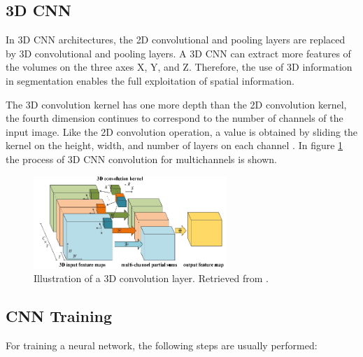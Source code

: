 \subsection*{3D CNN}
\label{subsection:3dcnn}
In \ac{3D} \ac{CNN} architectures, the \ac{2D} convolutional and pooling layers are replaced by \ac{3D} convolutional and pooling layers. A \ac{3D} \ac{CNN} can extract more features of the volumes on the three axes X, Y, and Z. Therefore, the use of \ac{3D} information in segmentation enables the full exploitation of spatial information.

The \ac{3D} convolution kernel has one more depth than the \ac{2D} convolution kernel, the fourth dimension continues to correspond to the number of channels of the input image. Like the \ac{2D} convolution operation, a value is obtained by sliding the kernel on the height, width, and number of layers on each channel \cite{2018guide}. In figure \ref{fig:cnn_3D} the process of \ac{3D} \ac{CNN} convolution for multichannels is shown.

\begin{figure}[!htb]
  \centering
  \includegraphics[width=0.65\textwidth]{Images/3dconv.jpg}
  \caption[Illustration of a \ac{3D} convolution layer]{Illustration of a \ac{3D} convolution layer. Retrieved from \cite{CNN:3D}.}
  \label{fig:cnn_3D}
\end{figure}


\subsection{CNN Training}

For training a neural network, the following steps are usually performed:

